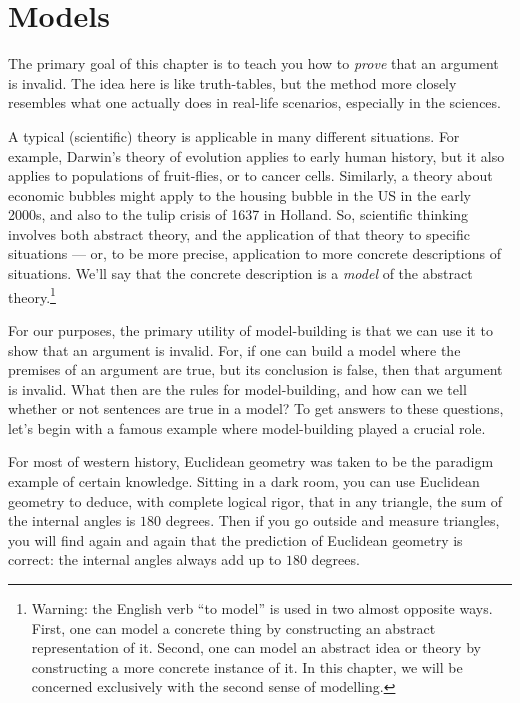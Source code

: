 \chapter{Models} \label{inter}

The primary goal of this chapter is to teach you how to {\it prove}
that an argument is invalid.  The idea here is like truth-tables, but
the method more closely resembles what one actually does in real-life
scenarios, especially in the sciences.

A typical (scientific) theory is applicable in many different
situations.  For example, Darwin's theory of evolution applies to
early human history, but it also applies to populations of
fruit-flies, or to cancer cells.  Similarly, a theory about economic
bubbles might apply to the housing bubble in the US in the early
2000s, and also to the tulip crisis of 1637 in Holland.  So,
scientific thinking involves both abstract theory, and the application
of that theory to specific situations --- or, to be more precise,
application to more concrete descriptions of situations.  We'll say
that the concrete description is a \emph{model} of the abstract
theory.\footnote{Warning: the English verb ``to model'' is used in two
  almost opposite ways.  First, one can model a concrete thing by
  constructing an abstract representation of it.  Second, one can
  model an abstract idea or theory by constructing a more concrete
  instance of it.  In this chapter, we will be concerned exclusively
  with the second sense of modelling.}

For our purposes, the primary utility of model-building is that we can
use it to show that an argument is invalid.  For, if one can build a
model where the premises of an argument are true, but its conclusion
is false, then that argument is invalid.  What then are the rules for
model-building, and how can we tell whether or not sentences are true
in a model?  To get answers to these questions, let's begin with a
famous example where model-building played a crucial role.

For most of western history, Euclidean geometry was taken to be the
paradigm example of certain knowledge.  Sitting in a dark room, you
can use Euclidean geometry to deduce, with complete logical rigor,
that in any triangle, the sum of the internal angles is $180$ degrees.
Then if you go outside and measure triangles, you will find again and
again that the prediction of Euclidean geometry is correct: the
internal angles always add up to $180$ degrees.

